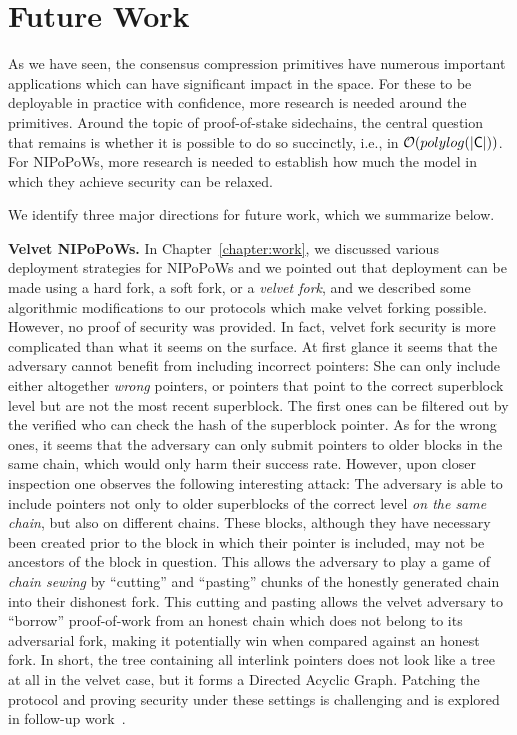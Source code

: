 \section{Future Work}

As we have seen, the consensus compression primitives have numerous important
applications which can have significant impact in the space. For these to be
deployable in practice with confidence, more research is needed around the
primitives. Around the topic of proof-of-stake sidechains, the central question
that remains is whether it is possible to do so succinctly, i.e., in
$\mathcal{O}(polylog(|\mathsf{C}|))$. For NIPoPoWs, more research is needed to establish
how much the model in which they achieve security can be relaxed.

We identify three major directions for future work, which we summarize below.

\textbf{Velvet NIPoPoWs.} In Chapter~\ref{chapter:work}, we discussed various
deployment strategies for NIPoPoWs and we pointed out that deployment can be
made using a hard fork, a soft fork, or a \emph{velvet fork}, and we described
some algorithmic modifications to our protocols which make velvet forking
possible. However, no proof of security was provided. In fact, velvet fork
security is more complicated than what it seems on the surface. At first
glance it seems that the adversary cannot benefit from including incorrect
pointers: She can only include either altogether \emph{wrong} pointers, or
pointers that point to the correct superblock level but are not the most recent
superblock. The first ones can be filtered out by the verified who can check the
hash of the superblock pointer. As for the wrong ones, it seems that the
adversary can only submit pointers to older blocks in the same chain, which
would only harm their success rate. However, upon closer inspection one observes
the following interesting attack: The adversary is able to include pointers not
only to older superblocks of the correct level \emph{on the same chain}, but
also on different chains. These blocks, although they have necessary been
created prior to the block in which their pointer is included, may not be
ancestors of the block in question. This allows the adversary to play a game of
\emph{chain sewing} by ``cutting'' and ``pasting'' chunks of the honestly
generated chain into their dishonest fork. This cutting and pasting allows the
velvet adversary to ``borrow'' proof-of-work from an honest chain which does not
belong to its adversarial fork, making it potentially win when compared against
an honest fork. In short, the tree containing all interlink pointers does not
look like a tree at all in the velvet case, but it forms a Directed Acyclic
Graph. Patching the protocol and proving security under these settings is
challenging and is explored in follow-up work~\cite{velvet-nipopows}.

